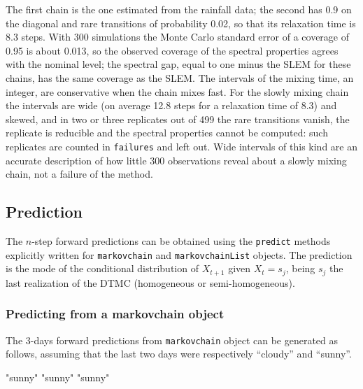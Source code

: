 \documentclass[
  nojss]{jss}
\begin{document}
The first chain is the one estimated from the rainfall data; the second has
0.9 on the diagonal and rare transitions of probability 0.02, so that its
relaxation time is 8.3 steps. With 300 simulations the Monte Carlo standard
error of a coverage of 0.95 is about 0.013, so the observed coverage of the
spectral properties agrees with the nominal level; the spectral gap, equal to
one minus the SLEM for these chains, has the same coverage as the SLEM. The
intervals of the mixing time, an integer, are conservative when the chain
mixes fast. For the slowly mixing chain the intervals are wide (on average
12.8 steps for a relaxation time of 8.3) and skewed, and in two or three
replicates out of 499 the rare transitions vanish, the replicate is
reducible and the spectral properties cannot be computed: such replicates are
counted in \texttt{failures} and left out. Wide intervals of this kind are an
accurate description of how little 300 observations reveal about a slowly
mixing chain, not a failure of the method.

\subsection{Prediction}\label{prediction}

The \(n\)-step forward predictions can be obtained using the \texttt{predict} methods explicitly written for \texttt{markovchain} and \texttt{markovchainList} objects. The prediction is the mode of the conditional distribution of \(X_{t+1}\) given \(X_{t}=s_{j}\), being \(s_{j}\) the last realization of the DTMC (homogeneous or semi-homogeneous).

\subsubsection{Predicting from a markovchain object}\label{predicting-from-a-markovchain-object}

The 3-days forward predictions from \texttt{markovchain} object can be generated as follows, assuming that the last two days were respectively ``cloudy'' and ``sunny''.

\begin{CodeChunk}
\begin{CodeOutput}
[1] "sunny" "sunny" "sunny"
\end{CodeOutput}
\end{CodeChunk}
\end{document}
